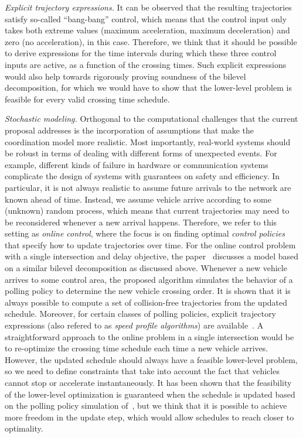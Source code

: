 \documentclass{article}
\theoremstyle{definition}
\theoremstyle{plain}
\begin{document}
\vspace{0.5em}\noindent
\textit{Explicit trajectory expressions.}
It can be observed that the resulting trajectories satisfy so-called
``bang-bang'' control, which means that the control input only takes both
extreme values (maximum acceleration, maximum deceleration) and zero (no
acceleration), in this case. Therefore, we think that it should be possible to
derive expressions for the time intervals during which these three control
inputs are active, as a function of the crossing times.
%
Such explicit expressions would also help towards rigorously proving soundness
of the bilevel decomposition, for which we would have to show that the
lower-level problem is feasible for every valid crossing time schedule.

\vspace{0.5em}\noindent
\textit{Stochastic modeling.}
Orthogonal to the computational challenges that the current proposal addresses
is the incorporation of assumptions that make the coordination model more
realistic. Most importantly, real-world systems should be robust in terms of
dealing with different forms of unexpected events. For example, different kinds
of failure in hardware or communication systems complicate the design of systems
with guarantees on safety and efficiency.
%
In particular, it is not always realistic to assume future arrivals to the network are known
ahead of time. Instead, we assume vehicle arrive according to some (unknown)
random process, which means that current trajectories may need to be
reconsidered whenever a new arrival happens. Therefore, we refer to this setting
as \textit{online control}, where the focus is on finding optimal \textit{control policies} that
specify how to update trajectories over time.
%
For the online control problem with a single intersection and delay objective,
the paper~\cite{miculescuPollingsystemsbasedAutonomousVehicle2016} discusses a
model based on a similar bilevel decomposition as discussed above. Whenever a
new vehicle arrives to some control area, the proposed algorithm simulates the
behavior of a polling policy to determine the new vehicle crossing order. It is
shown that it is always possible to compute a set of collision-free trajectories
from the updated schedule. Moreover, for certain classes of polling policies,
explicit trajectory expressions (also refered to as \textit{speed profile
  algorithms}) are available~\cite{timmermanPlatoonFormingAlgorithms2021}.
A straightforward approach to the online problem in a single intersection would
be to re-optimize the crossing time schedule each time a new vehicle arrives.
However, the updated schedule should always have a feasible lower-level problem,
so we need to define constraints that take into account the fact that vehicles
cannot stop or accelerate instantaneously. It has been shown that the
feasibility of the lower-level optimization is guaranteed when the schedule is
updated based on the polling policy simulation
of~\cite{miculescuPollingsystemsbasedAutonomousVehicle2016}, but we think that
it is possible to achieve more freedom in the update step, which would allow
schedules to reach closer to optimality.
\end{document}
